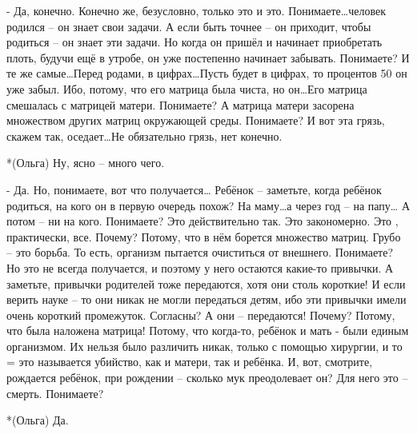 - Да, конечно. Конечно же, безусловно, только это и это. Понимаете…человек родился – он знает свои задачи. А если быть точнее – он приходит, чтобы родиться – он знает эти задачи. Но когда он пришёл и начинает приобретать плоть, будучи ещё в утробе, он уже постепенно начинает забывать. Понимаете? И те же самые…Перед родами, в цифрах…Пусть будет в цифрах, то процентов 50 он уже забыл. Ибо, потому, что его матрица была чиста, но он…Его матрица смешалась с матрицей матери. Понимаете? А матрица матери засорена множеством других матриц окружающей среды. Понимаете? И вот эта грязь, скажем так, оседает…Не обязательно грязь, нет конечно.

*(Ольга) Ну, ясно – много чего.

- Да. Но, понимаете, вот что получается… Ребёнок – заметьте, когда ребёнок родиться, на кого он в первую очередь похож? На маму…а через год – на папу… А потом – ни на кого. Понимаете? Это действительно так. Это закономерно. Это , практически, все. Почему? Потому, что в нём борется множество матриц. Грубо – это борьба. То есть, организм пытается очиститься от внешнего. Понимаете? Но это не всегда получается, и поэтому у него остаются какие-то привычки. А заметьте, привычки родителей тоже передаются, хотя они столь короткие! И если верить науке – то они никак не могли передаться детям, ибо эти привычки имели очень короткий промежуток. Согласны? А они – передаются! Почему? Потому, что была наложена матрица! Потому, что когда-то, ребёнок и мать - были единым организмом. Их нельзя было различить никак, только с помощью хирургии, и то = это называется убийство, как и матери, так и ребёнка. И, вот, смотрите, рождается ребёнок, при рождении – сколько мук преодолевает он? Для него это – смерть. Понимаете?

*(Ольга) Да.

